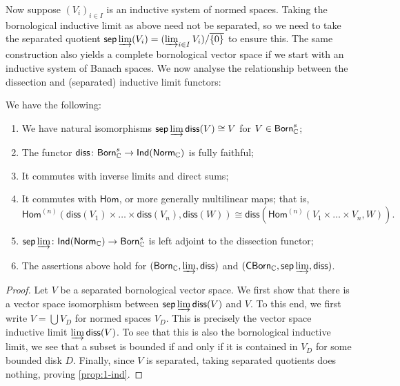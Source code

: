 Now suppose \((V_i)_{i \in I}\) is an inductive system of normed spaces. Taking the bornological inductive limit as above need not be separated, so we need to take the separated quotient \(\mathsf{sep} \varinjlim (V_i) = (\varinjlim_{i \in I} V_i)/\overline{\{0\}}\) to ensure this. The same construction also yields a complete bornological vector space if we start with an inductive system of Banach spaces. We now analyse the relationship between the dissection and (separated) inductive limit functors:

\begin{proposition} We have the following:
\begin{enumerate}
    \item\label{prop:1-ind} We have natural isomorphisms \(\mathsf{sep} \varinjlim\mathsf{diss} (V) \cong V\) for \(V \in \mathsf{Born}_\mathbb C^s\);
    \item\label{prop:2-ind} The functor \(\mathsf{diss} \colon \mathsf{Born}_\mathbb C^s \to  \mathsf{Ind}(\mathsf{Norm}_\mathbb C)\) is fully faithful;
    \item\label{prop:3-ind} It commutes with inverse limits and direct sums;
    \item\label{prop:4-ind} It commutes with \(\mathsf{Hom}\), or more generally multilinear maps; that is, 
    \[\mathsf{Hom}^{(n)}(\mathsf{diss}(V_1) \times \dotsc \times \mathsf{diss}(V_n), \mathsf{diss}(W)) \cong \mathsf{diss}(\mathsf{Hom}^{(n)}(V_1 \times \dotsc \times V_n, W)).\]
    \item\label{prop:5-ind} \(\mathsf{sep} \varinjlim \colon \mathsf{Ind}(\mathsf{Norm}_\mathbb C) \to \mathsf{Born}_\mathbb C^s \) is left adjoint to the dissection functor;
    \item\label{prop:6-ind} The assertions above hold for \((\mathsf{Born}_\mathbb C, \varinjlim, \mathsf{diss})\) and \((\mathsf{CBorn}_\mathbb C, \mathsf{sep}\varinjlim, \mathsf{diss})\). 
\end{enumerate}

\end{proposition}

\begin{proof}

Let \(V\) be a separated bornological vector space. We first show that there is a vector space isomorphism between \(\mathsf{sep} \varinjlim \mathsf{diss}(V)\) and \(V\). To this end, we first write \(V = \bigcup V_D\) for normed spaces \(V_D\). This is precisely the vector space inductive limit \(\varinjlim \mathsf{diss}(V)\). To see that this is also the bornological inductive limit, we see that a subset is bounded if and only if it is contained in \(V_D\) for some bounded disk \(D\). Finally, since \(V\) is separated, taking separated quotients does nothing, proving \ref{prop:1-ind}. 


\end{proof}